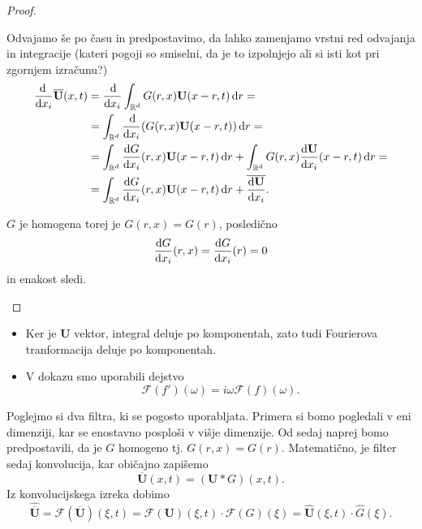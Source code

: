 \documentclass[mat2, tisk]{fmfdelo}
\newcommand{\R}{\mathbb R}
\newcommand{\bd}{\textbf}
\begin{document}
\begin{proof}
\begin{enumerate}
  Odvajamo še po času in predpostavimo, da lahko zamenjamo vrstni red odvajanja in integracije 
  (kateri pogoji so smiselni, da je to izpolnjejo ali si isti kot pri zgornjem izračunu?) 
  \begin{align*}
  \frac{\!\!\dif}{\dif x_i} \overline{\bd{U}}(x, t) &= \frac{\dif}{\dif x_i} \int_{\R^d} G(r, x) \bd{U}(x-r, t) \dif r = \\
  &=  \int_{\R^d} \frac{\dif}{\dif x_i} (G(r, x) \bd{U}(x-r, t)) \dif r = \\
  &=  \int_{\R^d} \frac{\dif G}{\dif x_i}(r, x)  \bd{U}(x-r, t) \dif r + \int_{\R^d} G(r, x)  \frac{\dif \bd{U}}{\dif x_i}(x-r, t) \dif r = \\
  &= \int_{\R^d} \frac{\dif G}{\dif x_i}(r, x)  \bd{U}(x-r, t) \dif r + \overline{\frac{\dif \bd{U}}{\dif x_i}}.
  \end{align*}

  $G$ je homogena torej je $G(r, x) = G(r)$, posledično 
  $$\frac{\dif G}{\dif x_i}(r, x) = \frac{\dif G}{\dif x_i}(r) = 0$$
  in enakost sledi.
\end{enumerate}
\end{proof}

\begin{opomba}
  \hfill
\begin{itemize}
  \item Ker je $\bd{U}$ vektor, integral deluje po komponentah, zato tudi Fourierova tranformacija deluje po komponentah. 
  \item V dokazu smo uporabili dejstvo 
  $$ \mathcal{F}(f')(\omega) =  i\omega \mathcal{F}(f)(\omega). $$
\end{itemize}
\end{opomba}

\noindent
Poglejmo si dva filtra, ki se pogosto uporabljata. Primera si bomo pogledali v eni dimenziji, 
kar se enostavno  posploši v višje dimenzije. Od sedaj naprej bomo predpostavili, da je 
$G$ homogeno tj. $G(r, x) = G(r)$. Matematično, je filter sedaj konvolucija, kar običajno 
zapišemo
\begin{equation}
\overline{\bd{U}}(x, t) = (\bd{U} * G)(x, t).
\end{equation}
Iz konvolucijskega izreka dobimo 
\begin{equation}
\hat{\overline{\bd{U}}} = \mathcal{F}(\overline{\bd{U}})(\xi, t) = \mathcal{F}(\bd{U})(\xi, t)\cdot \mathcal{F}(G)(\xi)= 
\hat{\bd{U}}(\xi, t)\cdot \hat{G}(\xi).
\end{equation}
\\[1mm] 
\end{document}

